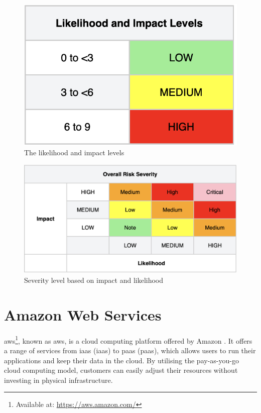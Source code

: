 \vspace{2mm}
\begin{figure}[H]
    \centering
    \includegraphics[scale=0.5]{Images/OWASP-likelihood.png}
    \caption{The likelihood and impact levels}
    \label{fig: Impact levels}
\end{figure}

\vspace{2mm}
\begin{figure}[H]
    \centering
    \includegraphics[scale=0.4]{Images/OWASP-severity.png}
    \caption{Severity level based on impact and likelihood}
    \label{fig: OWASP Severity Scale}
\end{figure}

\section{Amazon Web Services}
\acrlong{aws}\footnote{Available at: \url{https://aws.amazon.com/}}, known as \acrshort{aws}, is a cloud computing platform offered by Amazon \cite{aws}. It offers a range of services from \acrlong{iaas} (\acrshort{iaas}) to \acrlong{paas} (\acrshort{paas}), which allows users to run their applications and keep their data in the cloud. By utilising the pay-as-you-go cloud computing model, customers can easily adjust their resources without investing in physical infrastructure.

